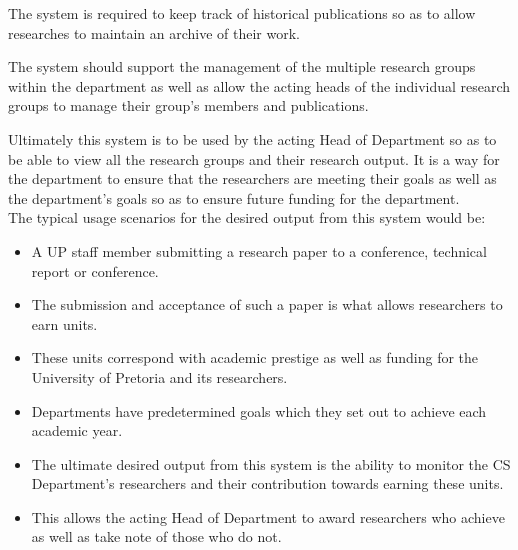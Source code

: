 \documentclass{article}
\begin{document}
		The system is required to keep track of historical publications so as to allow researches to maintain an archive of their work.
		
		The system should support the management of the multiple research groups within the department as well as allow the acting heads of the individual research groups to manage their group's members and publications.
		
		Ultimately this system is to be used by the acting Head of Department so as to be able to view all the research groups and their research output. It is a way for the department to ensure that the researchers are meeting their goals as well as the department's goals so as to ensure future funding for the department.\\
		[5mm]
		The typical usage scenarios for the desired output from this system would be:
		\begin{itemize}
			\item A UP staff member submitting a research paper to a conference, technical report or conference.
			\item The submission and acceptance of such a paper is what allows researchers to earn units.
			\item These units correspond with academic prestige as well as funding for the University of Pretoria and its researchers.
			\item Departments have predetermined goals which they set out to achieve each academic year.
			\item The ultimate desired output from this system is the ability to monitor the CS Department's researchers and their contribution towards earning these units.
			\item This allows the acting Head of Department to award researchers who achieve as well as take note of those who do not.
		\end{itemize}
	\cleardoublepage
\end{document}
